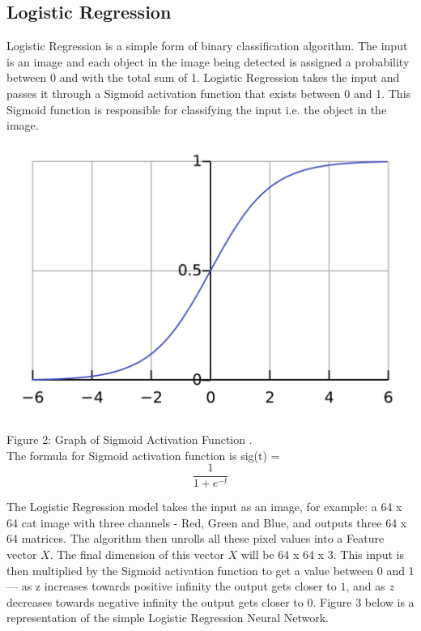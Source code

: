 \documentclass[conference]{IEEEtran}
\begin{document}
\subsection{\textbf{Logistic Regression}}
Logistic Regression is a simple form of binary classification algorithm. The input is an image and each object in the image being detected is assigned a probability between 0 and with the total sum of 1. Logistic Regression takes the input and passes it through a Sigmoid activation function that exists between 0 and 1. This Sigmoid function is responsible for classifying the input i.e. the object in the image.
\begin{center}
    \includegraphics[scale=0.1]{1920px-Logistic-curve.svg.png}\\
\end{center}
Figure 2: Graph of Sigmoid Activation Function \cite{3}.\\

The formula for Sigmoid activation function is sig(t) =
\[\frac{1}{1+e^{-t}}\]

The Logistic Regression model takes the input as an image, for example: a 64 x 64 cat image with three channels - Red, Green and Blue, and outputs three 64 x 64 matrices. The algorithm then unrolls all these pixel values into a Feature vector $X$. The final dimension of this vector $X$ will be 64 x 64 x 3. This input is then multiplied by the Sigmoid activation function to get a value between 0 and 1 — as z increases towards positive infinity the output gets closer to $1$, and as $z$ decreases towards negative infinity the output gets closer to 0. Figure 3 below is a representation of the simple Logistic Regression Neural Network.
\end{document}
